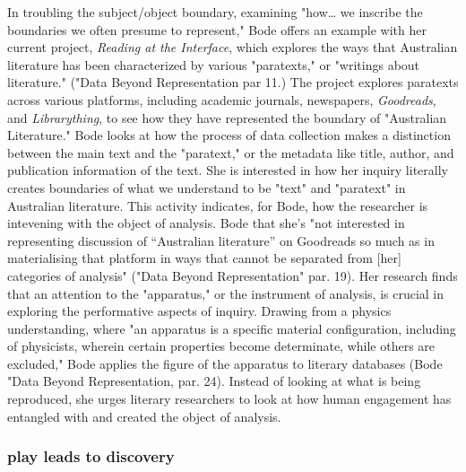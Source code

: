 \documentclass[11pt]{article}
\begin{document}
In troubling the subject/object boundary, examining "how\ldots{} we
inscribe the boundaries we often presume to represent," Bode offers an
example with her current project, \emph{Reading at the Interface}, which
explores the ways that Australian literature has been characterized by
various "paratexts," or "writings about literature."  ("Data Beyond
Representation par 11.) The project explores paratexts across various
platforms, including academic journals, newspapers, \emph{Goodreads}, and
\emph{Librarything}, to see how they have represented the boundary of
"Australian Literature." Bode looks at how the process of data
collection makes a distinction between the main text and the
"paratext," or the metadata like title, author, and publication
information of the text. She is interested in how her inquiry
literally creates boundaries of what we understand to be "text" and
"paratext" in Australian literature. This activity indicates, for
Bode, how the researcher is intevening with the object of
analysis. Bode that she's "not interested in representing discussion
of “Australian literature” on Goodreads so much as in materialising
that platform in ways that cannot be separated from [her] categories
of analysis" ("Data Beyond Representation" par. 19). Her research
finds that an attention to the "apparatus," or the instrument of
analysis, is crucial in exploring the performative aspects of
inquiry. Drawing from a physics understanding, where "an apparatus is
a specific material configuration, including of physicists, wherein
certain properties become determinate, while others are excluded,"
Bode applies the figure of the apparatus to literary databases (Bode
"Data Beyond Representation, par. 24). Instead of looking at what is
being reproduced, she urges literary researchers to look at how human
engagement has entangled with and created the object of analysis.

\subsubsection{play leads to discovery}
\label{sec:org56b4051}
\end{document}
